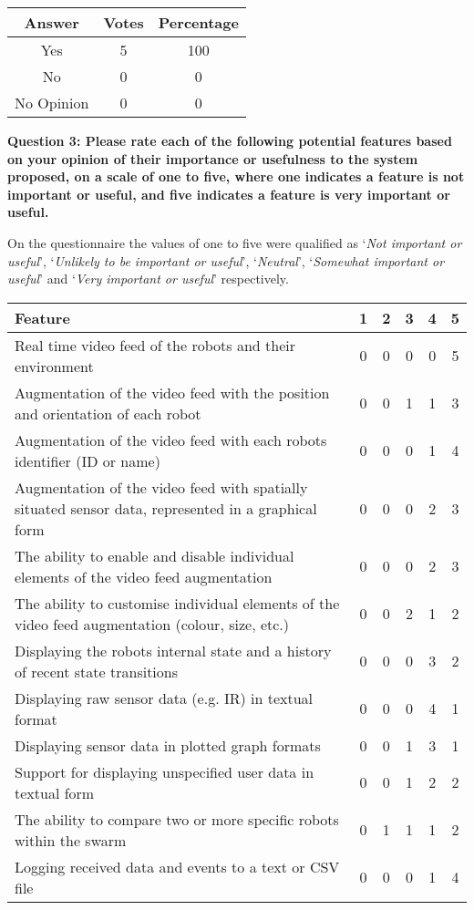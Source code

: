 \begin{center}
\begin{tabular}{ c c c }
 Answer & Votes & Percentage \\ 
 \hline
 Yes & 5 & 100 \\ 
 No & 0 & 0 \\
 No Opinion & 0 & 0 \\
\end{tabular}
\end{center}

\vspace{2cm}

\textbf{Question 3: Please rate each of the following potential features based on your opinion of their importance or usefulness to the system proposed, on a scale of one to five, where one indicates a feature is not important or useful, and five indicates a feature is very important or useful.}

On the questionnaire the values of one to five were qualified as `\textit{Not important or useful}', `\textit{Unlikely to be important or useful}', `\textit{Neutral}', `\textit{Somewhat important or useful}' and `\textit{Very important or useful}' respectively.

\begin{center}
\begin{tabular}{ p{10cm} c c c c c }
 Feature & 1 & 2 & 3 & 4 & 5 \\ 
 \hline
 Real time video feed of the robots and their environment & 0 & 0 & 0 & 0 & 5\\
 Augmentation of the video feed with the position and orientation of each robot & 0 & 0 & 1 & 1 & 3\\
 Augmentation of the video feed with each robots identifier (ID or name) & 0 & 0 & 0 & 1 & 4\\
 Augmentation of the video feed with spatially situated sensor data, represented in a graphical form & 0 & 0 & 0 & 2 & 3\\
 The ability to enable and disable individual elements of the video feed augmentation & 0 & 0 & 0 & 2 & 3\\
 The ability to customise individual elements of the video feed augmentation (colour, size, etc.) & 0 & 0 & 2 & 1 & 2\\
 Displaying the robots internal state and a history of recent state transitions & 0 & 0 & 0 & 3 & 2\\
 Displaying raw sensor data (e.g. IR) in textual format & 0 & 0 & 0 & 4 & 1\\
 Displaying sensor data in plotted graph formats & 0 & 0 & 1 & 3 & 1\\
 Support for displaying unspecified user data in textual form & 0 & 0 & 1 & 2 & 2\\
 The ability to compare two or more specific robots within the swarm & 0 & 1 & 1 & 1 & 2\\
 Logging received data and events to a text or CSV file & 0 & 0 & 0 & 1 & 4\\
\end{tabular}
\end{center}

